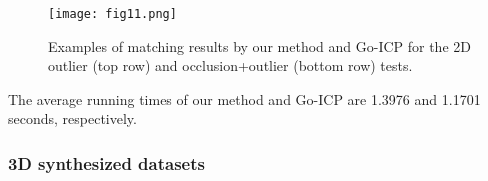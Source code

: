 \documentclass[11pt,bezier,]{article}
\begin{document}
\begin{figure}[ht]

\texttt{[image: fig11.png]}

% 
% 



  \caption{
Examples of   matching results by our method and Go-ICP 
for the 2D outlier (top row) and occlusion+outlier (bottom row) tests.
  \label{3D_nonrotate_exa}}
\end{figure}

The average running times of our method and Go-ICP are  1.3976 and 1.1701 seconds, respectively.



\subsubsection{ 3D synthesized datasets}
\end{document}
